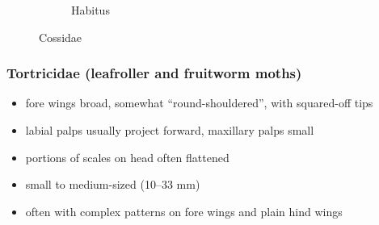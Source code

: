 \documentclass[letterpaper, 11pt]{article}
\begin{document}
\begin{figure}[ht!]
\begin{subfigure}[ht!]{0.48\textwidth}
        \caption{Habitus}
        \label{fig:cossid2}
    \end{subfigure}
    \caption{Cossidae}\label{fig:cossids}
\end{figure}

\subsubsection{Tortricidae (leafroller and fruitworm moths)}
\begin{itemize}
\item fore wings broad, somewhat ``round-shouldered'', with squared-off tips
\item labial palps usually project forward, maxillary palps small
\item portions of scales on head often flattened
\item small to medium-sized (10--33 mm)
\item often with complex patterns on fore wings and plain hind wings
\end{itemize}
\end{document}
